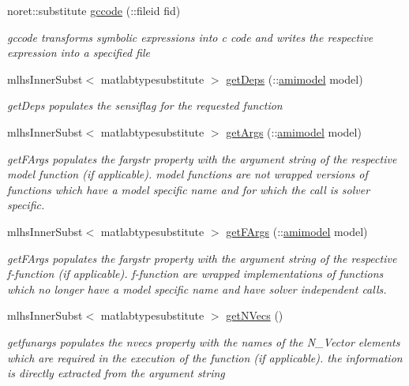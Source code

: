 \begin{DoxyCompactItemize}
noret\+::substitute \hyperlink{classamifun_ae91161616e6339e77298a072acb5dd58}{gccode} (\+::fileid fid)
\begin{DoxyCompactList}\small\item\em gccode transforms symbolic expressions into c code and writes the respective expression into a specified file \end{DoxyCompactList}\item 
mlhs\+Inner\+Subst$<$ matlabtypesubstitute $>$ \hyperlink{classamifun_a1cb97b695ab609e1655ec1067b140b70}{get\+Deps} (\+::\hyperlink{classamimodel}{amimodel} model)
\begin{DoxyCompactList}\small\item\em get\+Deps populates the sensiflag for the requested function \end{DoxyCompactList}\item 
mlhs\+Inner\+Subst$<$ matlabtypesubstitute $>$ \hyperlink{classamifun_a4b16e7670c0d60e530545e58628bde3f}{get\+Args} (\+::\hyperlink{classamimodel}{amimodel} model)
\begin{DoxyCompactList}\small\item\em get\+F\+Args populates the fargstr property with the argument string of the respective model function (if applicable). model functions are not wrapped versions of functions which have a model specific name and for which the call is solver specific. \end{DoxyCompactList}\item 
mlhs\+Inner\+Subst$<$ matlabtypesubstitute $>$ \hyperlink{classamifun_aa1f074dbf83e821bc999eb2d701fd9ed}{get\+F\+Args} (\+::\hyperlink{classamimodel}{amimodel} model)
\begin{DoxyCompactList}\small\item\em get\+F\+Args populates the fargstr property with the argument string of the respective f-\/function (if applicable). f-\/function are wrapped implementations of functions which no longer have a model specific name and have solver independent calls. \end{DoxyCompactList}\item 
mlhs\+Inner\+Subst$<$ matlabtypesubstitute $>$ \hyperlink{classamifun_a3ae210044df5eb51e2f9280d03b86c3c}{get\+N\+Vecs} ()
\begin{DoxyCompactList}\small\item\em getfunargs populates the nvecs property with the names of the N\+\_\+\+Vector elements which are required in the execution of the function (if applicable). the information is directly extracted from the argument string \end{DoxyCompactList}\item 

\end{DoxyCompactItemize}
